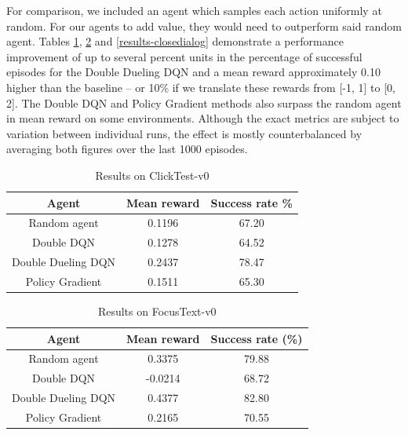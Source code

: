 \documentclass[10pt,journal,compsoc]{IEEEtran}
\begin{document}
For comparison, we included an agent which samples each action uniformly at random. For our agents to add value, they would need to outperform said random agent. Tables \ref{results-clicktest}, \ref{results-focustext} and \ref{results-closedialog} demonstrate a performance improvement of up to several percent units in the percentage of successful episodes for the Double Dueling DQN and a mean reward approximately 0.10 higher than the baseline -- or 10\% if we translate these rewards from [-1, 1] to [0, 2]. The Double DQN and Policy Gradient methods also surpass the random agent in mean reward on some environments. Although the exact metrics are subject to variation between individual runs, the effect is mostly counterbalanced by averaging both figures over the last 1000 episodes.

\begin{table}[!t]
\renewcommand{\arraystretch}{1.3}
\caption{Results on ClickTest-v0}
\label{results-clicktest}
\centering
\begin{tabular}{|c||c|c|}
\hline
Agent & Mean reward & Success rate \% \\
\hline
Random agent & 0.1196 & 67.20\\
\hline
Double DQN & 0.1278 & 64.52\\
\hline
Double Dueling DQN & 0.2437 & 78.47\\

\hline
Policy Gradient & 0.1511 & 65.30\\
\hline
\end{tabular}
\end{table}

\begin{table}[!t]
\renewcommand{\arraystretch}{1.3}
\caption{Results on FocusText-v0}
\label{results-focustext}
\centering
\begin{tabular}{|c||c|c|}
\hline
Agent & Mean reward & Success rate (\%) \\
\hline
Random agent & 0.3375 & 79.88\\
\hline
Double DQN & -0.0214 & 68.72\\
\hline
Double Dueling DQN & 0.4377 & 82.80 \\
\hline
Policy Gradient &  0.2165 & 70.55\\
\hline
\end{tabular}
\end{table}
\end{document}
